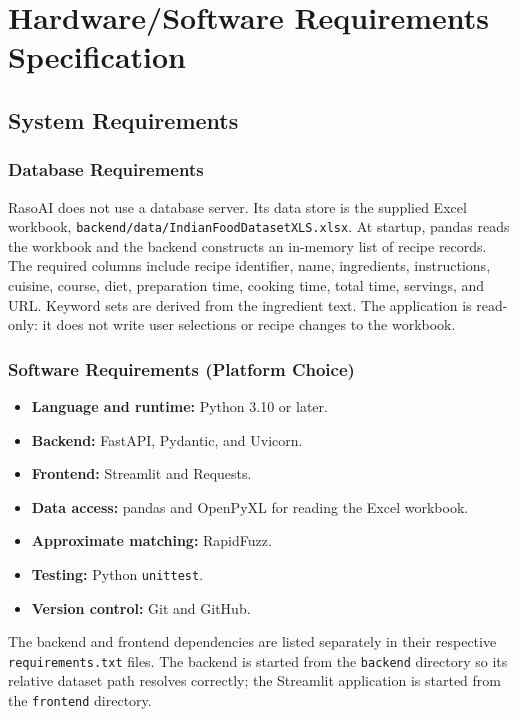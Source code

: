\documentclass[12pt,a4paper]{report}
\begin{document}
\chapter{Hardware/Software Requirements Specification}
\label{chap:requirements}

\section{System Requirements}
\label{sec:sys_req}

\subsection{Database Requirements}
\label{subsec:db_req}

RasoAI does not use a database server. Its data store is the supplied Excel workbook, \texttt{backend/data/IndianFoodDatasetXLS.xlsx}. At startup, pandas reads the workbook and the backend constructs an in-memory list of recipe records. The required columns include recipe identifier, name, ingredients, instructions, cuisine, course, diet, preparation time, cooking time, total time, servings, and URL. Keyword sets are derived from the ingredient text. The application is read-only: it does not write user selections or recipe changes to the workbook.

\subsection{Software Requirements (Platform Choice)}
\label{subsec:soft_req}

\begin{itemize}
  \item \textbf{Language and runtime:} Python 3.10 or later.
  \item \textbf{Backend:} FastAPI, Pydantic, and Uvicorn.
  \item \textbf{Frontend:} Streamlit and Requests.
  \item \textbf{Data access:} pandas and OpenPyXL for reading the Excel workbook.
  \item \textbf{Approximate matching:} RapidFuzz.
  \item \textbf{Testing:} Python \texttt{unittest}.
  \item \textbf{Version control:} Git and GitHub.
\end{itemize}

The backend and frontend dependencies are listed separately in their respective \texttt{requirements.txt} files. The backend is started from the \texttt{backend} directory so its relative dataset path resolves correctly; the Streamlit application is started from the \texttt{frontend} directory.
\end{document}
